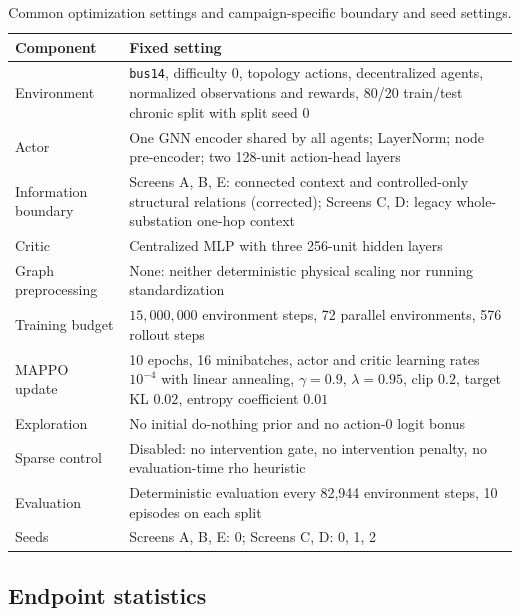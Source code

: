 \begin{table}[H]
  \centering
  \small
  \caption{Common optimization settings and campaign-specific boundary and
  seed settings.}
  \label{tab:screening-common-settings}
  \setlength{\tabcolsep}{4pt}
  \begin{tabular}{L{0.24\textwidth}L{0.68\textwidth}}
    \toprule
    Component & Fixed setting \\
    \midrule
    Environment & \texttt{bus14}, difficulty 0, topology actions, decentralized agents, normalized observations and rewards, 80/20 train/test chronic split with split seed 0 \\
    Actor & One GNN encoder shared by all agents; LayerNorm; node pre-encoder; two 128-unit action-head layers \\
    Information boundary & Screens A, B, E: connected context and controlled-only structural relations (corrected); Screens C, D: legacy whole-substation one-hop context \\
    Critic & Centralized MLP with three 256-unit hidden layers \\
    Graph preprocessing & None: neither deterministic physical scaling nor running standardization \\
    Training budget & \(15{,}000{,}000\) environment steps, 72 parallel environments, 576 rollout steps \\
    MAPPO update & 10 epochs, 16 minibatches, actor and critic learning rates \(10^{-4}\) with linear annealing, \(\gamma=0.9\), \(\lambda=0.95\), clip \(0.2\), target KL \(0.02\), entropy coefficient \(0.01\) \\
    Exploration & No initial do-nothing prior and no action-0 logit bonus \\
    Sparse control & Disabled: no intervention gate, no intervention penalty, no evaluation-time rho heuristic \\
    Evaluation & Deterministic evaluation every 82{,}944 environment steps, 10 episodes on each split \\
    Seeds & Screens A, B, E: 0; Screens C, D: 0, 1, 2 \\
    \bottomrule
  \end{tabular}
\end{table}

\subsection{Endpoint statistics}
\label{subsec:screening-endpoint-statistics}

